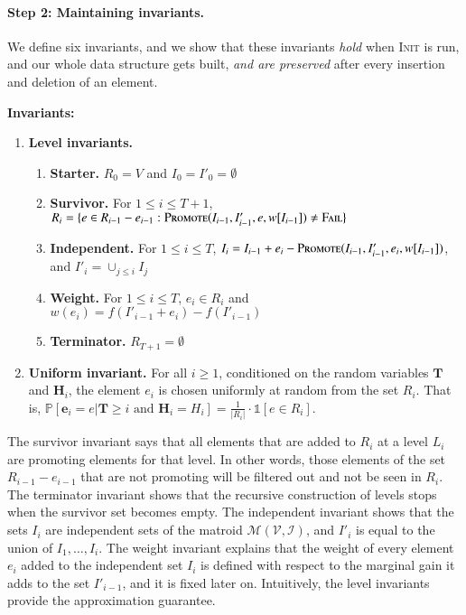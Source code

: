 \documentclass[11pt]{article}
\renewcommand{\Pr}[1]{\ensuremath{\mathbb{P}\left[#1\right]}}
\newcommand{\ind}[1]{\ensuremath{\mathds{1}\left[#1\right]}}
\newcommand{\err}{{\textsc{Fail}}}
\newcommand{\matroid}{\mathcal{M}(\ground,\mathcal{I})}
\newcommand{\init}{\textsc{Init}}
\newcommand{\replacementTester}{\textsc{Promote}}
\newcommand{\ground}{\ensuremath{\mathcal{V}}}
\newcommand{\bE}{\ensuremath{\mathbf{e}}}
\newcommand{\bT}{\ensuremath{\mathbf{T}}}
\newcommand{\bH}{\ensuremath{\mathbf{H}}}
\begin{document}
\paragraph{Step 2: Maintaining invariants.}
We define six invariants, and we show that these invariants \emph{hold} when \init{} is run, and our whole data structure gets built, \emph{and are preserved} after every insertion and deletion of an element. 

\begin{tcolorbox}[width=\linewidth, colback=white!80!gray,boxrule=0pt,frame hidden, sharp corners]
\textbf{Invariants:} 
\begin{enumerate}

\item \textbf{Level invariants.} 
\begin{enumerate}
    \item \textbf{Starter.} $R_0=V$ and $I_0 = I'_0 = \emptyset$
    \item \textbf{Survivor.}  For $1 \leq i \leq T + 1$, $R_i = \{ e \in R_{i-1} - e_{i-1}: \replacementTester{}(I_{i-1}, I'_{i-1}, e, w[I_{i-1}]) \ne \err\}$ 
    \item  \textbf{Independent.} For $1 \leq i \leq T$, $I_i = I_{i-1} + e_i - \replacementTester{}(I_{i-1}, I'_{i-1}, e_i, w[I_{i-1}])$, and $I'_i = \cup_{j \le i} I_j$
    \item  \textbf{Weight.} For $1 \leq i \leq T$, $e_i \in R_i$ and  $w(e_i) = f(I'_{i-1} + e_i) - f(I'_{i-1})$
    \item \textbf{Terminator.} $R_{T+1}=\emptyset$
\end{enumerate}
     \item  \textbf{Uniform invariant.} For all $i \ge 1$, conditioned on the random variables $\bT$ and $\bH_i$, the element $e_i$ is chosen uniformly at random 
          from the set $R_i$. That is, 
            $ \Pr{\bE_i = e |  \bT \geq i \text{ and } \bH_i = H_i  }= \frac{1}{|R_i|}\cdot \ind{e\in R_i}  $.

\end{enumerate}
\end{tcolorbox}




The survivor invariant says that all elements that are added to $R_i$ at a level $L_i$ 
are promoting elements for that level. 
In other words, those elements of the set $R_{i-1} - e_{i-1}$ 
that are not promoting will be filtered out and not be seen in $R_i$. 
The terminator invariant shows that the recursive construction of levels stops when the survivor set becomes empty. 
The independent invariant shows that the sets $I_i$ are independent sets of the matroid $\matroid$, and $I'_i$ is equal to the union of $I_1, \dots, I_i$.
The weight invariant explains that the weight of every element $e_i$  added to the independent set $I_i$ is defined with respect to the marginal gain it adds to the set $I'_{i-1}$, and it is fixed later on. 
Intuitively, the level invariants provide the approximation guarantee. 
\end{document}
